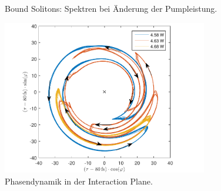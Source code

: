 \documentclass[bachelor,       %
               twoside,        %
               BCOR10mm,       %
               english,ngerman, %
               ]{GAUBM}
\begin{document}
\begin{figure}[!htb]
   \hfill
   \caption{Bound Solitons: Spektren bei Änderung der Pumpleistung.}
   \label{fig:boundSpectro}
 \end{figure}
 
 \begin{figure}[!htb]
	\centering
	\includegraphics[width=0.8\textwidth]{figures/4ms_25GSA_400m_MLrun_runBounceFix_InteractionPlaneArrows2.pdf}
	\caption{Phasendynamik in der Interaction Plane.}
	\label{fig:interactionPlane}
\end{figure}
\end{document}
